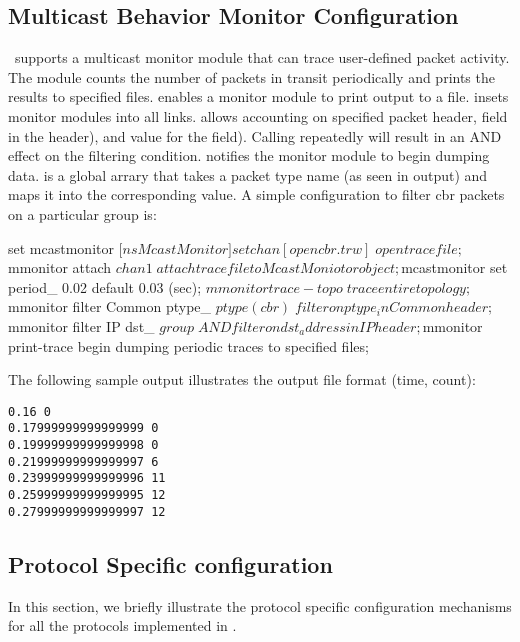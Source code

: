 \subsection{Multicast Behavior Monitor Configuration}
\ns\ supports a multicast monitor module that can trace
user-defined packet activity.
The module counts the number of packets in transit periodically
and prints the results to specified files.  enables a 
monitor module to print output to a file. 
 insets monitor modules into all links. 
 allows accounting on specified packet header, 
field in the header), and value for the field).  Calling 
repeatedly will result in an AND effect on the filtering condition.
 notifies the monitor module to begin dumping data.
 is a global arrary that takes a packet type name (as seen in
 output) and maps it into the corresponding value.  
A simple configuration to filter cbr packets on a particular group is:

\begin{program}
        set mcastmonitor [$ns McastMonitor]
        set chan [open cbr.tr w] \; open trace file;
        $mmonitor attach $chan1  \; attach trace file to McastMoniotor object;
        $mcastmonitor set period_ 0.02         \; default 0.03 (sec);
        $mmonitor trace-topo   \; trace entire topology;
        $mmonitor filter Common ptype_ $ptype(cbr) \; filter on ptype_ in Common header;
        $mmonitor filter IP dst_ $group \; AND filter on dst_ address in IP header;
        $mmonitor print-trace  \; begin dumping periodic traces to specified files;

\end{program} %

The following sample output illustrates the output file format (time, count):
{\small
\begin{verbatim}
0.16 0
0.17999999999999999 0
0.19999999999999998 0
0.21999999999999997 6
0.23999999999999996 11
0.25999999999999995 12
0.27999999999999997 12
\end{verbatim}
}

\subsection{Protocol Specific configuration}

In this section, we briefly illustrate the
protocol specific configuration mechanisms
for all the protocols implemented in \ns.

